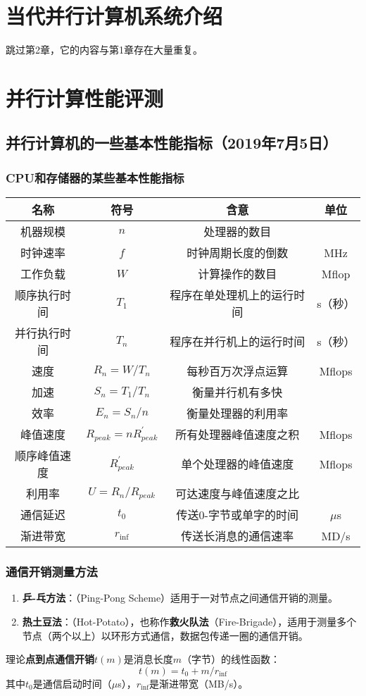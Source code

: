 \documentclass{article}
\begin{document}
	\section{当代并行计算机系统介绍}
	跳过第2章，它的内容与第1章存在大量重复。
	\section{并行计算性能评测}		
		\subsection{并行计算机的一些基本性能指标（2019年7月5日）}
			\subsubsection{CPU和存储器的某些基本性能指标}
				\begin{table}[H]
					\centering
					\begin{tabular}{|c|c|c|c|}
						\hline
						名称&符号&含意&单位\\
						\hline
						机器规模&$n$&处理器的数目&\\
						时钟速率&$f$&时钟周期长度的倒数&MHz\\
						工作负载&$W$&计算操作的数目&Mflop\\
						顺序执行时间&$T_{1}$&程序在单处理机上的运行时间&s（秒）\\
						并行执行时间&$T_{n}$&程序在并行机上的运行时间&s（秒）\\
						速度&$R_{n}=W/T_{n}$&每秒百万次浮点运算&Mflops\\
						加速&$S_{n}=T_{1}/T_{n}$&衡量并行机有多快&\\
						效率&$E_{n}=S_{n}/n$&衡量处理器的利用率&\\
						峰值速度&$R_{peak}=nR_{peak}^{'}$&所有处理器峰值速度之积&Mflops\\
						顺序峰值速度&$R_{peak}^{'}$&单个处理器的峰值速度&Mflops\\
						利用率&$U=R_{n}/R_{peak}$&可达速度与峰值速度之比&\\
						通信延迟&$t_{0}$&传送0-字节或单字的时间&$\mu$s\\
						渐进带宽&$r_{\inf}$&传送长消息的通信速率&MD/s\\
						\hline
					\end{tabular}
				\end{table}
			\subsubsection{通信开销测量方法}
				\begin{enumerate}
					\item \textbf{乒-乓方法}：（Ping-Pong Scheme）适用于一对节点之间通信开销的测量。
					\item \textbf{热土豆法}：（Hot-Potato），也称作\textbf{救火队法}（Fire-Brigade），适用于测量多个节点（两个以上）以环形方式通信，数据包传递一圈的通信开销。
				\end{enumerate}
				理论\textbf{点到点通信开销}$t(m)$是消息长度$m$（字节）的线性函数：
				$$t(m)=t_{0}+m/r_{\inf}$$
				其中$t_{0}$是通信启动时间（$\mu$s），$r_{\inf}$是渐进带宽（MB/s）。
\end{document}
